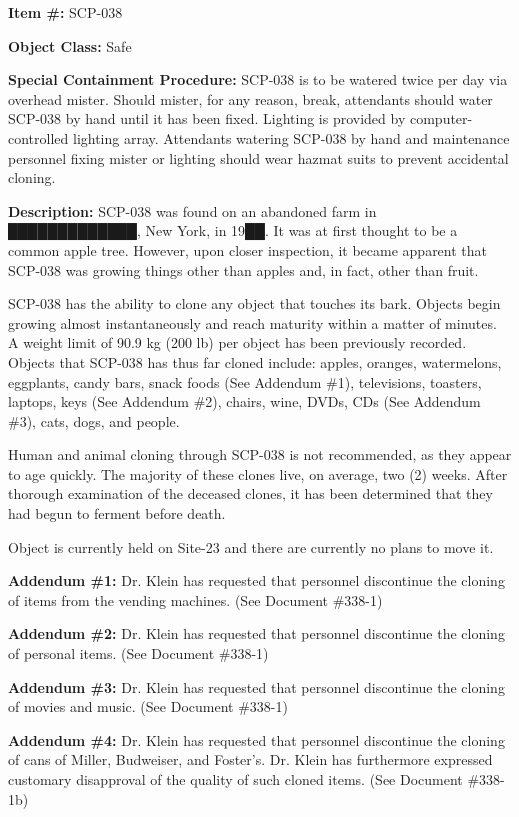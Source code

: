 
\textbf{Item \#:} SCP-038

\textbf{Object Class:} Safe

\textbf{Special Containment Procedure:} SCP-038 is to be watered twice per day via overhead mister. Should mister, for any reason, break, attendants should water SCP-038 by hand until it has been fixed. Lighting is provided by computer-controlled lighting array. Attendants watering SCP-038 by hand and maintenance personnel fixing mister or lighting should wear hazmat suits to prevent accidental cloning.

\textbf{Description:} SCP-038 was found on an abandoned farm in █████████████, New York, in 19██. It was at first thought to be a common apple tree. However, upon closer inspection, it became apparent that SCP-038 was growing things other than apples and, in fact, other than fruit.

SCP-038 has the ability to clone any object that touches its bark. Objects begin growing almost instantaneously and reach maturity within a matter of minutes. A weight limit of 90.9 kg (200 lb) per object has been previously recorded. Objects that SCP-038 has thus far cloned include: apples, oranges, watermelons, eggplants, candy bars, snack foods (See Addendum \#1), televisions, toasters, laptops, keys (See Addendum \#2), chairs, wine, DVDs, CDs (See Addendum \#3), cats, dogs, and people.

Human and animal cloning through SCP-038 is not recommended, as they appear to age quickly. The majority of these clones live, on average, two (2) weeks. After thorough examination of the deceased clones, it has been determined that they had begun to ferment before death.

Object is currently held on Site-23 and there are currently no plans to move it.

\textbf{Addendum \#1:} Dr. Klein has requested that personnel discontinue the cloning of items from the vending machines. (See Document \#338-1)

\textbf{Addendum \#2:} Dr. Klein has requested that personnel discontinue the cloning of personal items. (See Document \#338-1)

\textbf{Addendum \#3:} Dr. Klein has requested that personnel discontinue the cloning of movies and music. (See Document \#338-1)

\textbf{Addendum \#4:} Dr. Klein has requested that personnel discontinue the cloning of cans of Miller, Budweiser, and Foster's. Dr. Klein has furthermore expressed customary disapproval of the quality of such cloned items. (See Document \#338-1b)

